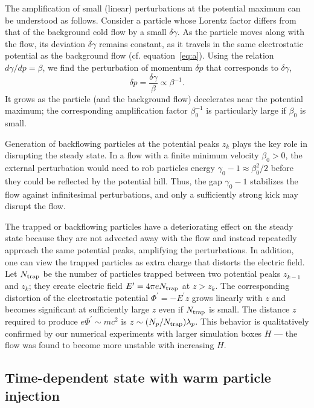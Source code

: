 The amplification of small (linear) perturbations at the potential maximum can be
understood as follows.
Consider a particle whose Lorentz factor differs from that of the background cold
flow by a small $\delta\gamma$. As the particle moves along with the flow, its deviation
$\delta\gamma$ remains constant, as it travels in the same electrostatic potential as
the background flow (cf. equation~\ref{eq:a}). Using the relation $d\gamma/dp=\beta$, we
find the perturbation of momentum $\delta p$ that corresponds to $\delta\gamma$,
\begin{equation}
    \delta p = \frac{\delta\gamma}{\beta}\propto \beta^{-1}.
\end{equation}
It grows as the particle (and the background flow) decelerates near the potential maximum;
the corresponding amplification factor $\beta_0^{-1}$ is particularly large if
$\beta_0$ is small.

Generation of backflowing particles at the potential peaks $z_k$ plays the key role in
disrupting the steady state. In a flow with a finite minimum velocity
$\beta_0>0$, the external perturbation would need to rob particles
energy $\gamma_0-1\approx \beta_0^2/2$ before they could be reflected by the
potential hill. Thus, the gap $\gamma_0-1$ stabilizes the flow against infinitesimal
perturbations, and only a sufficiently strong kick may disrupt the flow.

The trapped or backflowing particles have a deteriorating effect on the steady state
because they are not advected away with the flow and instead repeatedly approach
the same potential peaks, amplifying the perturbations. In addition, one can view
the trapped particles as extra
charge that distorts the electric field. Let $N_{\rm trap}$ be the number of particles
trapped between two potential peaks $z_{k-1}$ and $z_k$; they create electric field
$E^\prime=4\pi eN_{\rm trap}$ at $z>z_k$. The corresponding distortion of the
electrostatic potential $\Phi^\prime=-E^\prime z$ grows linearly with $z$ and
becomes significant at sufficiently large $z$ even if $N_{\rm trap}$ is small.
The distance $z$ required to produce
$e\Phi^\prime \sim mc^2$ is $z\sim (N_p/N_{\rm trap})\lambda_p$.
This behavior is qualitatively confirmed by our numerical experiments with
larger simulation boxes $H$ --- the flow
was found to become more unstable with increasing $H$.


\subsection{Time-dependent state with warm particle injection}\label{sec:warm}


